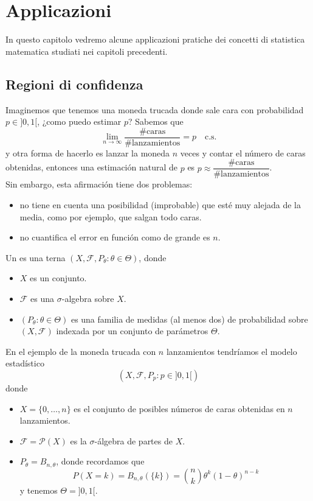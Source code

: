 \chapter{Applicazioni}
\noindent 
In questo capitolo vedremo alcune applicazioni pratiche dei concetti di statistica matematica studiati nei capitoli precedenti.

\section{Regioni di confidenza}
\noindent
Imaginemos que tenemos una moneda trucada donde sale cara con probabilidad $p\in ]0,1[$, ¿como puedo estimar $p$? Sabemos que 
$$ \lim_{n\to \infty} \dfrac{\#\text{caras}}{\#\text{lanzamientos}} = p \quad \text{c.s.}$$
y otra forma de hacerlo es lanzar la moneda $n$ veces y contar el número de caras obtenidas, entonces una estimación natural de $p$ es $p \approx \dfrac{\#\text{caras}}{\#\text{lanzamientos}}$. \\

\noindent
Sin embargo, esta afirmación tiene dos problemas:
\begin{itemize}
    \item no tiene en cuenta una posibilidad (improbable) que esté muy alejada de la media, como por ejemplo, que salgan todo caras.
    \item no cuantifica el error en función como de grande es $n$.
\end{itemize}

\begin{definicion}
    Un  es una terna $(X, \mathcal{F}, P_{\theta}: \theta \in \Theta)$, donde 
    \begin{itemize}
        \item $X$ es un conjunto.
        \item $\mathcal{F}$ es una $\sigma$-algebra sobre $X$.
        \item $(P_{\theta} : \theta \in \Theta)$ es una familia de medidas (al menos dos) de probabilidad sobre $(X, \mathcal{F})$ indexada por un conjunto de parámetros $\Theta$.
    \end{itemize}
\end{definicion}

\begin{ejemplo}
    En el ejemplo de la moneda trucada con $n$ lanzamientos tendríamos el modelo estadístico
    $$(X, \mathcal{F}, P_{p}: p \in ]0,1[)$$
    donde
    \begin{itemize}
        \item $X = \{0,\ldots, n\}$ es el conjunto de posibles números de caras obtenidas en $n$ lanzamientos.
        \item $\mathcal{F} = \mathcal{P}(X)$ es la $\sigma$-álgebra de partes de $X$.
        \item $P_{\theta}=B_{n,\theta}$, donde recordamos que 
        $$P(X=k)=B_{n,\theta}(\{k\})= \binom{n}{k} \theta^k (1-\theta)^{n-k}$$
        y tenemos $\Theta = ]0,1[$.
    \end{itemize}
\end{ejemplo}

